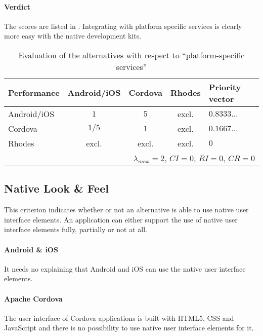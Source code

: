 \paragraph{Verdict} The scores are listed in . Integrating with platform specific services is clearly more easy with the native development kits.

\begin{table}[h!]
    \begin{center}
        \begin{tabular}{lcccl}
            \hline
            \textbf{Performance} & Android/iOS & Cordova & Rhodes & Priority vector \\
            \hline
            Android/iOS          & $1$         & $5$     & excl. & $0.8333\ldots$        \\
            Cordova              & $1/5$       & $1$     & excl. & $0.1667\ldots$        \\
            Rhodes               & excl.       & excl.   & excl. & $0$        \\
            \hline
            \multicolumn{5}{r}{$\lambda_{max} = 2$, $CI = 0$, $RI = 0$, $CR = 0$}\\
            \hline
        \end{tabular}
        \caption{Evaluation of the alternatives with respect to ``platform-specific services''}
        \label{tab:pss}
    \end{center}
\end{table}

\subsection{Native Look \& Feel}

This criterion indicates whether or not an alternative is able to use native user interface elements. An application can either support the use of native user interface elements fully, partially or not at all.

\paragraph{Android \& iOS} It needs no explaining that Android and iOS can use the native user interface elements.

\paragraph{Apache Cordova} The user interface of Cordova applications is built with HTML5, CSS and JavaScript and there is no possibility to use native user interface elements for it. 

